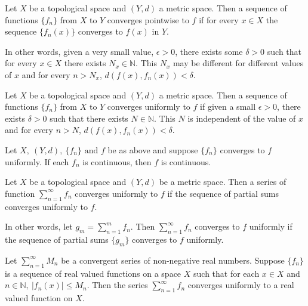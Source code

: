 \begin{definition}
	Let \( X \) be a topological space and \( (Y,d) \) a metric space.
	Then a sequence of functions \( \{ f_n \} \) from \( X \) to \( Y \) converges pointwise to \( f \) if for every \( x \in X \) the sequence \( \{ f_n(x) \} \) converges to \( f(x) \) in \( Y \).
\end{definition}
\begin{commentary}
	In other words, given a very small value, \( \epsilon > 0 \), there exists some \( \delta > 0 \) such that for every \( x \in X \) there exists \( N_x \in \mathbb{N} \).
	This \( N_x \) may be different for different values of \( x \) and for every \( n > N_x \), \( d(f(x),f_n(x)) < \delta \).
\end{commentary}

\begin{definition}
	Let \( X \) be a topological space and \( (Y,d) \) a metric space.
	Then a sequence of functions \( \{ f_n \} \) from \( X \) to \( Y \) converges uniformly to \( f \) if given a small \( \epsilon > 0 \), there exists \( \delta > 0 \) such that there exists \( N \in \mathbb{N} \).
	This $N$ is independent of the value of \( x \) and for every \( n > N \), \( d(f(x),f_n(x)) < \delta \).
\end{definition}

\begin{proposition}
	Let \( X,\ (Y,d),\ \{ f_n \} \text{ and } f \) be as above and suppose \( \{ f_n \} \) converges to \( f \) uniformly.
	If each \( f_n \) is continuous, then \( f \) is continuous.
\end{proposition}

\begin{definition}
	Let \( X \) be a topological space and \( (Y,d) \) be a metric space.
	Then a series of function \( \sum^\infty_{n = 1} f_n \) converges uniformly to \( f \) if the sequence of partial sums converges uniformly to \( f \).
\end{definition}
\begin{commentary}
	In other words, let \( g_m = \sum^m_{n = 1} f_n \).
	Then \( \sum^\infty_{n = 1} f_n \) converges to \( f \) uniformly if the sequence of partial sums \( \{ g_m \} \) converges to \( f \) uniformly.
\end{commentary}

\begin{proposition}
	Let \( \sum^\infty_{n = 1} M_n \) be a convergent series of non-negative real numbers.
	Suppose \( \{ f_n \} \) is a sequence of real valued functions on a space \( X \) such that for each \( x \in X \) and \( n \in \mathbb{N},\ |f_n(x)| \le M_n \).
	Then the series \( \sum^\infty_{n = 1} f_n \) converges uniformly to a real valued function on \( X \).
\end{proposition}

